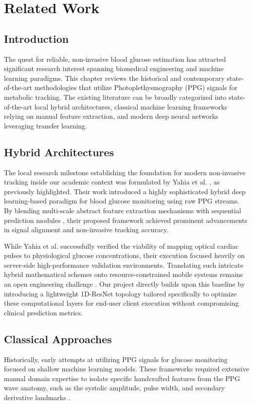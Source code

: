 \chapter{Related Work}
\label{ch:related_work}

\section{Introduction}
The quest for reliable, non-invasive blood glucose estimation has attracted significant research interest spanning biomedical engineering and machine learning paradigms. This chapter reviews the historical and contemporary state-of-the-art methodologies that utilize Photoplethysmography (PPG) signals for metabolic tracking. The existing literature can be broadly categorized into state-of-the-art local hybrid architectures, classical machine learning frameworks relying on manual feature extraction, and modern deep neural networks leveraging transfer learning.

\section{Hybrid Architectures}
The local research milestone establishing the foundation for modern non-invasive tracking inside our academic context was formulated by Yahia et al. \cite{ta2026hybrid}, as previously highlighted. Their work introduced a highly sophisticated hybrid deep learning-based paradigm for blood glucose monitoring using raw PPG streams. By blending multi-scale abstract feature extraction mechanisms with sequential prediction modules \cite{hochreiter1997long, cho2014learning}, their proposed framework achieved prominent advancements in signal alignment and non-invasive tracking accuracy.

While Yahia et al. \cite{ta2026hybrid} successfully verified the viability of mapping optical cardiac pulses to physiological glucose concentrations, their execution focused heavily on server-side high-performance validation environments. Translating such intricate hybrid mathematical schemes onto resource-constrained mobile systems remains an open engineering challenge \cite{lane2016deepx}. Our project directly builds upon this baseline by introducing a lightweight 1D-ResNet topology tailored specifically to optimize these computational layers for end-user client execution without compromising clinical prediction metrics.

\section{Classical Approaches}
Historically, early attempts at utilizing PPG signals for glucose monitoring focused on shallow machine learning models. These frameworks required extensive manual domain expertise to isolate specific handcrafted features from the PPG wave anatomy, such as the systolic amplitude, pulse width, and secondary derivative landmarks \cite{elgendi2012on}.

